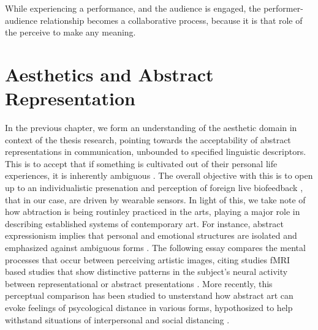 While experiencing a performance, and the audience is engaged, the performer-audience relationship becomes a collaborative process, because it is that role of the perceive to make any meaning.

\section{Aesthetics and Abstract Representation}
\label{lit_review:abstract}


In the previous chapter, we form an understanding of the aesthetic domain in context of the thesis research, pointing towards the acceptability of abstract representations in communication, unbounded to specified linguistic descriptors. This is to accept that if something is cultivated out of their personal life experiences, it is inherently ambiguous \cite{kaplan}. The overall objective with this is to open up to an individualistic presenation and perception of foreign live biofeedback \cite{lux_live_2018}, that in our case, are driven by wearable sensors. In light of this, we take note of how abtraction is being routinley practiced in the arts, playing a major role in describing established systems of contemporary art. For instance, abstract expressionism implies that personal and emotional structures are isolated and emphasized against ambiguous forms \cite{Pollock action}. The following essay compares the mental processes that occur between perceiving artistic images, citing studies fMRI based studies that show distinctive patterns in the subject's neural activity between representational or abstract presentations \cite{aviv 2014}. More recently, this perceptual comparison has been studied to unsterstand how abstract art can evoke feelings of psycological distance in various forms, hypothosized to help withstand situations of interpersonal and social distancing \cite{durkin_objective_2020}.


